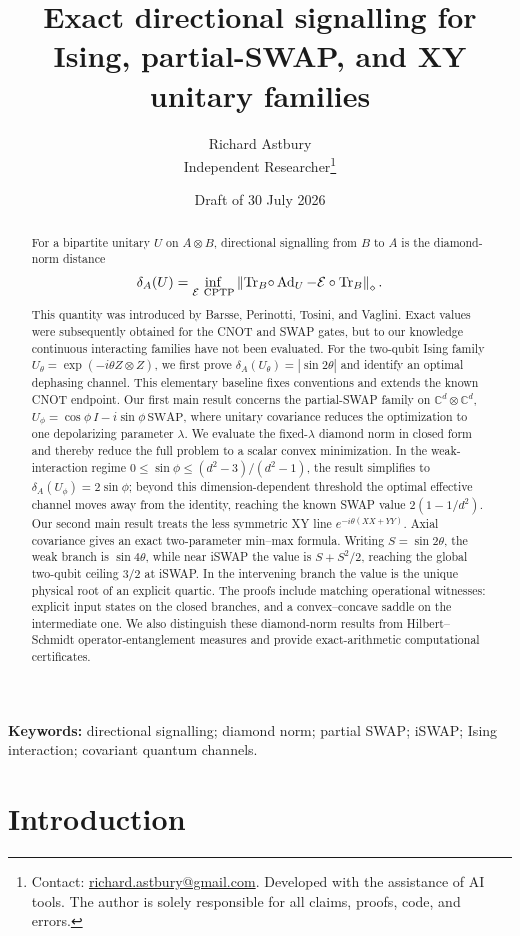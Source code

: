 \documentclass[11pt,a4paper]{article}
\title{\bfseries Exact directional signalling for Ising,
partial-SWAP, and XY unitary families}
\author{Richard Astbury\\
\normalsize Independent Researcher\thanks{Contact:
\href{mailto:richard.astbury@gmail.com}{richard.astbury@gmail.com}.
Developed with the assistance of AI tools. The author is solely responsible
for all claims, proofs, code, and errors.}}
\date{Draft of 30 July 2026}
\theoremstyle{remark}
\newcommand{\Tr}{\operatorname{Tr}}
\newcommand{\Ad}{\operatorname{Ad}}
\newcommand{\cE}{\mathcal{E}}
\newcommand{\diamondnorm}[1]{\left\lVert #1\right\rVert_{\diamond}}
\newcommand{\SWAP}{\mathrm{SWAP}}
\begin{document}
\maketitle

\begin{abstract}
For a bipartite unitary $U$ on $A\otimes B$, directional signalling from
$B$ to $A$ is the diamond-norm distance
\[
 \delta_A(U)=\inf_{\cE\ {\rm CPTP}}
 \diamondnorm{\Tr_B\!\circ\Ad_U-\cE\circ\Tr_B}.
\]
This quantity was introduced by Barsse, Perinotti, Tosini, and Vaglini.
Exact values were subsequently obtained for the CNOT and SWAP gates, but
to our knowledge continuous interacting families have not been evaluated.
For the two-qubit Ising family
$U_\theta=\exp(-i\theta Z\otimes Z)$, we first prove
$\delta_A(U_\theta)=|\sin 2\theta|$ and identify an optimal dephasing channel.
This elementary baseline fixes conventions and extends the known CNOT
endpoint.  Our first main result concerns the partial-SWAP family on
$\mathbb{C}^d\otimes\mathbb{C}^d$,
$U_\phi=\cos\phi\,I-i\sin\phi\,\SWAP$, where unitary covariance reduces the
optimization to one depolarizing parameter $\lambda$.  We evaluate the
fixed-$\lambda$ diamond norm in closed form and thereby reduce the full
problem to a scalar convex minimization.  In the weak-interaction regime
$0\leq\sin\phi\leq(d^2-3)/(d^2-1)$, the result simplifies to
$\delta_A(U_\phi)=2\sin\phi$; beyond this dimension-dependent threshold the
optimal effective channel moves away from the identity, reaching the known
SWAP value $2(1-1/d^2)$.
Our second main result treats the less symmetric XY line
$e^{-i\theta(XX+YY)}$.  Axial covariance gives an exact
two-parameter min--max formula.  Writing
$S=\sin2\theta$, the weak branch is $\sin4\theta$, while near iSWAP the value is
$S+S^2/2$, reaching the global two-qubit ceiling $3/2$ at iSWAP.  In the intervening branch the value is
the unique physical root of an explicit quartic.
The proofs include matching operational witnesses: explicit input states on
the closed branches, and a convex--concave saddle on the intermediate one.
We also distinguish
these diamond-norm results from Hilbert--Schmidt operator-entanglement
measures and provide exact-arithmetic computational certificates.
\end{abstract}

\noindent\textbf{Keywords:} directional signalling; diamond norm;
partial SWAP; iSWAP; Ising interaction; covariant quantum channels.

\section{Introduction}
\end{document}
